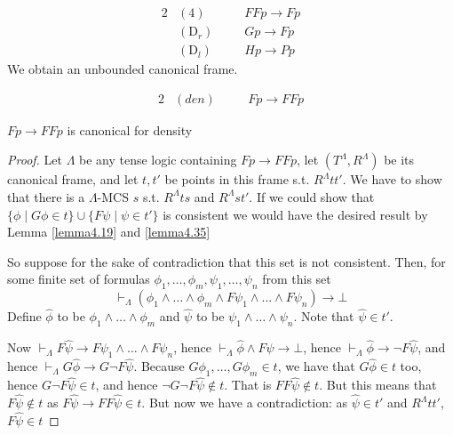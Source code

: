 \documentclass[11pt]{article}
\begin{document}
\begin{alignat*}{2}
&(4)&&FFp\to Fp\\
&(\text{D}_r)&&Gp\to Fp\\
&(\text{D}_l)\quad&&Hp\to Pp
\end{alignat*}
We obtain an unbounded canonical frame.

\begin{alignat*}{2}
&(den)\quad&& Fp\to FFp
\end{alignat*}

\begin{lemma}[]
\(Fp\to FFp\) is canonical for density
\end{lemma}

\begin{proof}
Let \(\Lambda\) be any tense logic containing \(Fp\to FFp\), let \((T^\Lambda,R^\Lambda)\) be its
canonical frame, and let \(t, t'\) be points in this frame s.t. \(R^\Lambda tt'\).
We have to show that there is a \(\Lambda\)-MCS \(s\) s.t. \(R^\Lambda ts\) and
\(R^\Lambda st'\). If we could show that
\(\{\phi\mid G\phi\in t\}\cup\{F\psi\mid \psi\in t'\}\) is consistent we
would have the desired result by Lemma \ref{lemma4.19} and \ref{lemma4.35}

So suppose for the sake of contradiction that this set is not consistent.
Then, for some finite set of formulas
\(\phi_1,\dots,\phi_m,\psi_1,\dots,\psi_n\) from this set
\begin{equation*}
\vdash_\Lambda(\phi_1\wedge\dots\wedge\phi_m\wedge F\psi_1\wedge\dots
\wedge F\psi_n)\to\bot
\end{equation*}
Define \(\widehat{\phi}\) to be \(\phi_1\wedge\dots\wedge\phi_m\) and
\(\widehat{\psi}\) to be \(\psi_1\wedge\dots\wedge\psi_n\). Note that
\(\widehat{\psi}\in t'\).

Now \(\vdash_\Lambda F\widehat{\psi}\to F\psi_1\wedge\dots\wedge F\psi_n\),
hence \(\vdash_\Lambda\widehat{\phi}\wedge F\widehat{\psi}\to\bot\), hence
\(\vdash_\Lambda\widehat{\phi}\to\neg F\widehat{\psi}\), and hence
\(\vdash_\Lambda G\widehat{\phi}\to G\neg F\widehat{\psi}\). Because
\(G\phi_1,\dots,G\phi_m\in t\), we have that \(G\widehat{\phi}\in t\) too, hence
\(G\neg F\widehat{\psi}\in t\), and hence \(\neg G\neg F\widehat{\psi}\not\in t\).
That is \(FF\widehat{\psi}\not\in t\). But this means that \(F\widehat{\psi}\not\in
   t\) as \(F\widehat{\psi}\to FF\widehat{\psi}\in t\). But now we have a
contradiction: as \(\widehat{\psi}\in t'\) and \(R^\Lambda tt'\), \(F\widehat{\psi}\in t\)
\end{proof}
\end{document}

